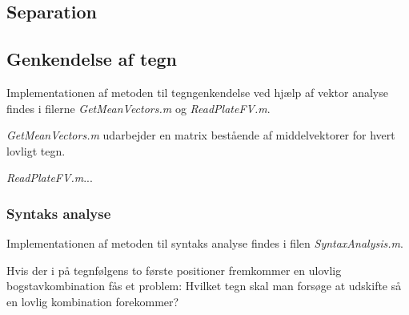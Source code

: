\subsection{Separation}


\subsection{Genkendelse af tegn}

Implementationen af metoden til tegngenkendelse ved hjælp af vektor analyse findes i filerne \textit{GetMeanVectors.m} og \textit{ReadPlateFV.m}.

\textit{GetMeanVectors.m} udarbejder en matrix bestående af middelvektorer for hvert lovligt tegn.

\textit{ReadPlateFV.m}...


\subsubsection{Syntaks analyse}

Implementationen af metoden til syntaks analyse findes i filen \textit{SyntaxAnalysis.m}.

Hvis der i på tegnfølgens to første positioner fremkommer en ulovlig bogstavkombination fås et problem: Hvilket tegn skal man forsøge at udskifte så en lovlig kombination forekommer? 